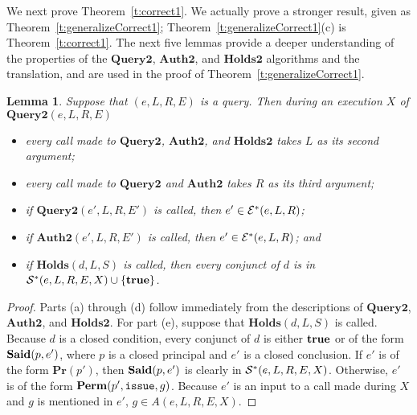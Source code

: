 \documentclass{acmtrans2m}
\newtheorem{lemma}[theorem]{Lemma}
\newcommand{\lem}{\begin{lemma}}
\newcommand{\prf}{\begin{proof}}
\newcommand{\elem}{\end{lemma}}
\newcommand{\eprf}{\end{proof}}
\newcommand{\<}{
}
\renewcommand{\>}{\rangle}
\newcommand{\union}{\cup}
\newcommand{\Said}{\mathit{\bf Said}}
\newcommand{\true}{\mathit{\bf{true}}}
\newcommand{\Permitted}{\mathit{\bf Perm}}
\newcommand{\cd}{d}
\newcommand{\cc}{e}
\newcommand{\scc}{E}
\newcommand{\issue}{\mathtt{issue}}
\newcommand{\XProcTwo}{\textbf{Query2}}
\newcommand{\CMetTwo}{\textbf{Holds2}}
\newcommand{\XATwo}{\textbf{Auth2}}
\newcommand{\CMetThree}{\textbf{Holds}}
\newcommand{\EStar}{{\cal E}^*}
\newcommand{\SStar}{{\cal S}^*}
\newcommand{\pred}[1]{\mathbf{#1}}
\newcommand{\EX}{X}
\begin{document}
We next prove Theorem~\ref{t:correct1}.  We actually prove a stronger result, given as
Theorem~\ref{t:generalizeCorrect1}; Theorem~\ref{t:generalizeCorrect1}(c) is
Theorem~\ref{t:correct1}.  The next five lemmas 
provide a deeper understanding of the properties of the $\XProcTwo$,
$\XATwo$, and $\CMetTwo$ algorithms and the translation, and are used
in the proof of Theorem~\ref{t:generalizeCorrect1}.

\lem\label{l1}
Suppose that $(\cc, L, R, \scc)$ is a query.  Then during an execution $\EX$ of
$\XProcTwo(\cc, L, R, \scc)$
\begin{itemize}
\item[(a)] every call made to $\XProcTwo$, $\XATwo$, and $\CMetTwo$ takes $L$ as its
second argument;
\item[(b)] every call made to $\XProcTwo$ and $\XATwo$ takes $R$ as its third argument;
\item[(c)] if $\XProcTwo(\cc', L, R, \scc')$ is called, then $\cc'\in \EStar(\cc, L, R)$;
\item[(d)] if $\XATwo(\cc', L, R, \scc')$ is called, then $\cc'\in \EStar(\cc, L, R)$;
and
\item[(e)] if $\CMetThree(\cd, L, S)$ is called, then every conjunct of $\cd$ is in
$\SStar(\cc, L, R, \scc, \EX)\union \{\true\}$.
\end{itemize}
\elem
\prf
Parts (a) through (d) follow immediately from the descriptions of $\XProcTwo$, $\XATwo$,
and $\CMetTwo$.  For part (e), suppose that $\CMetThree(\cd, L, S)$ is called.  Because
$\cd$ is a closed condition, every conjunct of $\cd$ is either $\true$ or of the form
$\Said(p, \cc')$, where $p$ is a closed principal and $\cc'$ is a closed conclusion.
If $\cc'$ is of the form $\pred{Pr}(p')$, then $\Said(p, \cc')$ is clearly in
$\SStar(\cc, L, R, \scc, \EX)$.  Otherwise, $\cc'$ is of the form
$\Permitted(p', \issue, g)$.  Because $\cc'$ is an input to a call made during $\EX$ and
$g$ is mentioned in $\cc'$, $g\in A(\cc, L, R, \scc, \EX)$.
\eprf
\end{document}
